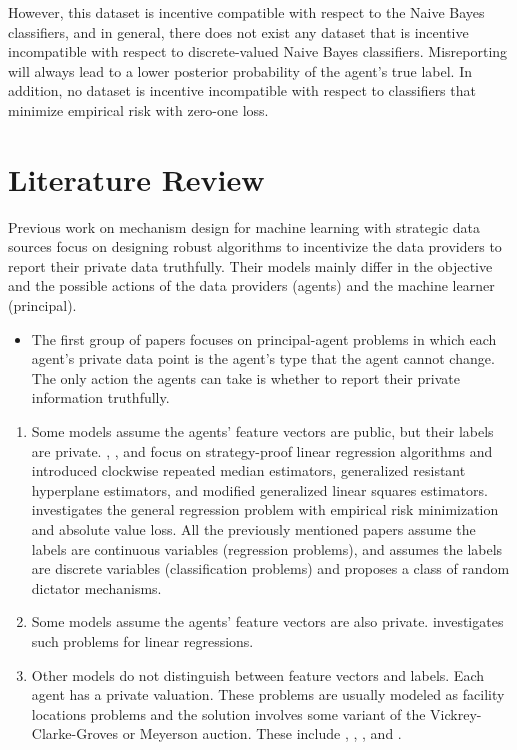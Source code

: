 \documentclass{article}
\begin{document}
\newline \newline
However, this dataset is incentive compatible with respect to the Naive Bayes classifiers, and in general, there does not exist any dataset that is incentive incompatible with respect to discrete-valued Naive Bayes classifiers. Misreporting will always lead to a lower posterior probability of the agent's true label. In addition, no dataset is incentive incompatible with respect to classifiers that minimize empirical risk with zero-one loss.
\newline \newline



\section{Literature Review} 
Previous work on mechanism design for machine learning with strategic data sources focus on designing robust algorithms to incentivize the data providers to report their private data truthfully. Their models mainly differ in the objective and the possible actions of the data providers (agents) and the machine learner (principal).
\begin{itemize}
\item The first group of papers focuses on principal-agent problems in which each agent's private data point is the agent's type that the agent cannot change. The only action the agents can take is whether to report their private information truthfully.
\end{itemize}
\begin{enumerate}
\item Some models assume the agents' feature vectors are public, but their labels are private. \citet*{perote2004strategy}, \citet*{chen2018strategyproof}, and \citet*{gast2013linear} focus on strategy-proof linear regression algorithms and introduced clockwise repeated median estimators, generalized resistant hyperplane estimators, and modified generalized linear squares estimators. \citet*{dekel2010incentive} investigates the general regression problem with empirical risk minimization and absolute value loss. All the previously mentioned papers assume the labels are continuous variables (regression problems), and \citet*{meir2012algorithms} assumes the labels are discrete variables (classification problems) and proposes a class of random dictator mechanisms.
\item Some models assume the agents' feature vectors are also private. \citet*{chen2019grinding} investigates such problems for linear regressions.
\item Other models do not distinguish between feature vectors and labels. Each agent has a private valuation. These problems are usually modeled as facility locations problems and the solution involves some variant of the Vickrey-Clarke-Groves or Meyerson auction. These include \citet*{dutting2017optimal}, \citet*{golowich2018deep}, \citet*{epasto2018incentive}, and \citet*{procaccia2009approximate}.
\end{enumerate}
\end{document}
